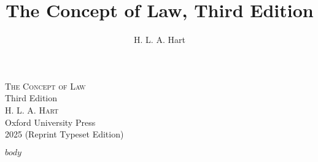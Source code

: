 \documentclass[12pt,oneside]{book}  %
\title{The Concept of Law, Third Edition}
\author{H. L. A. Hart}
\date{}
\begin{document}
\begin{titlepage}
  \centering
  \vspace*{3cm}
  {\Huge\textsc{The Concept of Law}}\\[1.5ex]
  {\Large Third Edition}\\[4ex]
  \textsc{H. L. A. Hart}\\[6ex]
  {\small Oxford University Press\\
  2025 (Reprint Typeset Edition)}
  \vfill
\end{titlepage}

$body$  %
\end{document}
